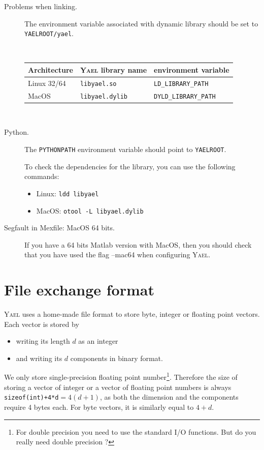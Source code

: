 \documentclass[a4paper,11pt,notitlepage,final,twoside]{report}
\newcommand{\yael}{\textsc{Yael}\xspace}
\newcommand{\yroot}{\texttt{YAELROOT}\xspace}
\newcommand{\tc}[1]{\texttt{#1}}
\begin{document}
\begin{description}
\item [Problems when linking.] The environment variable associated with dynamic library should be set to \tc{\yroot/yael}. 

{~ \hfill 
\begin{tabular}{|lll|}
\hline
Architecture & \yael library name  &  environment variable  \\
\hline
Linux 32/64  & \tc{libyael.so}  & \tc{LD\_LIBRARY\_PATH} \\
MacOS       & \tc{libyael.dylib} & \tc{DYLD\_LIBRARY\_PATH} \\
\hline
\end{tabular} \hfill ~}

\item [Python.] The \tc{PYTHONPATH} environment variable should 
point to \tc{YAELROOT}. 


To check the dependencies for the library, you can use the following commands:
\begin{itemize}
\item Linux: \tc{ldd libyael}
\item MacOS: \tc{otool -L libyael.dylib}
\end{itemize}

\item [Segfault in Mexfile: MacOS 64 bits.] If you have a 64 bits Matlab version with MacOS, 
then you should check that you have used the flag --mac64 when configuring \yael. 
\end{description}


\appendix                     %

\chapter{File exchange format}               %
\label{cha:I/O}

\yael uses a home-made file format to store byte, integer or floating point vectors. 
Each vector is stored by
\begin{itemize}
\item writing its length $d$ as an integer
\item and writing its $d$ components in binary format. 
\end{itemize}
We only store single-precision floating point number\footnote{For
  double precision you need to use the standard I/O functions. But do
  you really need double precision ?}. Therefore the size of storing a
vector of integer or a vector of floating point numbers is always
\tc{sizeof(int)+4*d}$=4(d+1)$, as both the dimension and the
components require 4 bytes each. 
For byte vectors, it is similarly equal to $4+d$. 
 \medskip
\end{document}
